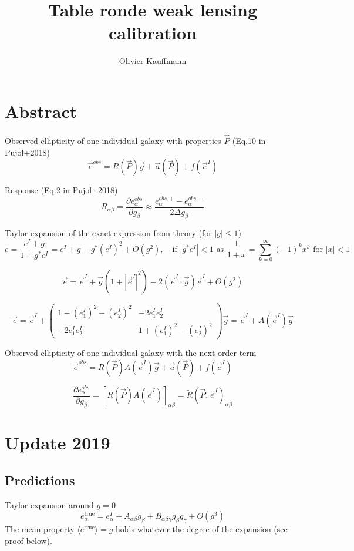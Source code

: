 \documentclass[a4paper]{article}
\title{\vspace{-2cm} Table ronde weak lensing calibration}
\author{Olivier Kauffmann}
\begin{document}
\maketitle



\section{Abstract}

Observed ellipticity of one individual galaxy with properties $\vec{P}$ (Eq.10 in Pujol+2018)
$$
\vec{e}^{obs} = R(\vec{P})\vec{g} +\vec{a}(\vec{P}) + f(\vec{e}^I)
$$

Response (Eq.2 in Pujol+2018)
$$
R_{\alpha\beta} = \dfrac{\partial e_\alpha^{obs}}{\partial g_\beta} \approx \dfrac{e_\alpha^{obs,+}-e_\alpha^{obs,-}}{2\Delta g_\beta}
$$


Taylor expansion of the exact expression from theory (for $|g|\leq1$)
$$
e = \dfrac{e^I+g}{1+g^*e^I} = e^I+g-g^*(e^I)^2 +O(g^2)
,\quad \text{if } |g^*e^I|<1 \text{ as } \dfrac{1}{1+x}=\sum_{k=0}^{\infty}(-1)^kx^k \text{ for } |x|<1 
$$

$$
\vec{e} = \vec{e}^I+\vec{g}(1+|\vec{e}^I|^2)-2(\vec{e}^I\cdot \vec{g})\vec{e}^I +O(g^2)
$$

$$
\vec{e} = \vec{e}^I +
\left(
\begin{array}{cc}
   1-(e_1^I)^2+(e_2^I)^2 & -2e_1^I e_2^I \\
   -2e_1^I e_2^I & 1+(e_1^I)^2-(e_2^I)^2 
\end{array}
\right)
\vec{g}= \vec{e}^I + A(\vec{e}^I)\vec{g}
$$


Observed ellipticity of one individual galaxy with the next order term
$$
\vec{e}^{obs} = R(\vec{P})A(\vec{e}^I)\vec{g} +\vec{a}(\vec{P}) + f(\vec{e}^I)
$$

$$
\dfrac{\partial e_\alpha^{obs}}{\partial g_\beta} = \left[R(\vec{P})A(\vec{e}^I)\right]_{\alpha\beta} = \widetilde{R}(\vec{P},\vec{e}^I)_{\alpha\beta}
$$


\section{Update 2019}
\subsection{Predictions}

Taylor expansion around $g=0$
$$
e_\alpha^\text{true} = e_\alpha^I + A_{\alpha\beta}g_\beta + B_{\alpha\beta\gamma}g_\beta g_\gamma + O(g^3)
$$
The mean property $\langle e^\text{true}\rangle=g$ holds whatever the degree of the expansion (see proof below).
\end{document}
